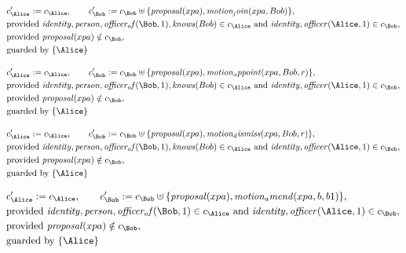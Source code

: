 \begin{align*}
&
c'_
{
\Alice
}
 := 
c_
{
\Alice
}
, \qquad 
c'_
{
\Bob
}
 := 
c_
{
\Bob
}
 \uplus 
\{
\mathit{
proposal
}
(
xpa
)
,
\mathit{
motion_join
}
(
xpa
,
Bob
)
\}
,\\
&
\text{provided } 
\mathit{
identity
}
,
\mathit{
person
}
,
\mathit{
officer_of
}
(
\Bob
,
1
)
,
\mathit{
knows
}
(
Bob
)
 \in c_
{
\Alice
}
 \text{ and } 
\mathit{
identity
}
,
\mathit{
officer
}
(
\Alice
,
1
)
 \in c_
{
\Bob
}
,\\
&
\text{provided } 
\mathit{
proposal
}
(
xpa
)
 \notin c_
{
\Bob
}
,\\
&
\text{guarded by } \{
\Alice
\}
\end{align*}

\begin{align*}
&
c'_
{
\Alice
}
 := 
c_
{
\Alice
}
, \qquad 
c'_
{
\Bob
}
 := 
c_
{
\Bob
}
 \uplus 
\{
\mathit{
proposal
}
(
xpa
)
,
\mathit{
motion_appoint
}
(
xpa
,
Bob
,
r
)
\}
,\\
&
\text{provided } 
\mathit{
identity
}
,
\mathit{
person
}
,
\mathit{
officer_of
}
(
\Bob
,
1
)
,
\mathit{
knows
}
(
Bob
)
 \in c_
{
\Alice
}
 \text{ and } 
\mathit{
identity
}
,
\mathit{
officer
}
(
\Alice
,
1
)
 \in c_
{
\Bob
}
,\\
&
\text{provided } 
\mathit{
proposal
}
(
xpa
)
 \notin c_
{
\Bob
}
,\\
&
\text{guarded by } \{
\Alice
\}
\end{align*}

\begin{align*}
&
c'_
{
\Alice
}
 := 
c_
{
\Alice
}
, \qquad 
c'_
{
\Bob
}
 := 
c_
{
\Bob
}
 \uplus 
\{
\mathit{
proposal
}
(
xpa
)
,
\mathit{
motion_dismiss
}
(
xpa
,
Bob
,
r
)
\}
,\\
&
\text{provided } 
\mathit{
identity
}
,
\mathit{
person
}
,
\mathit{
officer_of
}
(
\Bob
,
1
)
,
\mathit{
knows
}
(
Bob
)
 \in c_
{
\Alice
}
 \text{ and } 
\mathit{
identity
}
,
\mathit{
officer
}
(
\Alice
,
1
)
 \in c_
{
\Bob
}
,\\
&
\text{provided } 
\mathit{
proposal
}
(
xpa
)
 \notin c_
{
\Bob
}
,\\
&
\text{guarded by } \{
\Alice
\}
\end{align*}

\begin{align*}
&
c'_
{
\Alice
}
 := 
c_
{
\Alice
}
, \qquad 
c'_
{
\Bob
}
 := 
c_
{
\Bob
}
 \uplus 
\{
\mathit{
proposal
}
(
xpa
)
,
\mathit{
motion_amend
}
(
xpa
,
b
,
b1
)
\}
,\\
&
\text{provided } 
\mathit{
identity
}
,
\mathit{
person
}
,
\mathit{
officer_of
}
(
\Bob
,
1
)
 \in c_
{
\Alice
}
 \text{ and } 
\mathit{
identity
}
,
\mathit{
officer
}
(
\Alice
,
1
)
 \in c_
{
\Bob
}
,\\
&
\text{provided } 
\mathit{
proposal
}
(
xpa
)
 \notin c_
{
\Bob
}
,\\
&
\text{guarded by } \{
\Alice
\}
\end{align*}
